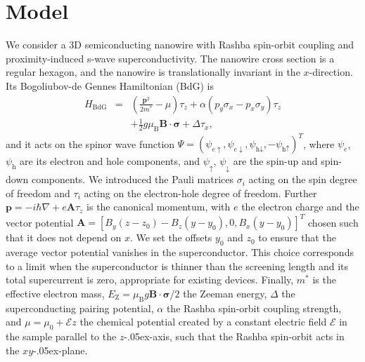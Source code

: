 \section{Model}


We consider a 3D semiconducting nanowire with Rashba spin-orbit coupling and proximity-induced s-wave superconductivity.
The nanowire cross section is a regular hexagon, and the nanowire is translationally invariant in the $x$-direction.
Its Bogoliubov-de Gennes Hamiltonian (BdG) is
\begin{eqnarray}
H_\textrm{BdG} & = & \left(\frac{\mathbf{p}^{2}}{2m^*}-\mu\right)\tau_z+\alpha\left(p_{y}\sigma_x -p_{x}\sigma_y \right)\tau_z\nonumber \\
 &  & +\frac{1}{2}g\mu_\textrm{B}\mathbf{B}\cdot\boldsymbol{\sigma}+\Delta\tau_x,\label{eq:H_BdG}
\end{eqnarray}
and it acts on the spinor wave function $\Psi={\left(\psi_{e\uparrow},\psi_{e\downarrow},\psi_{\textrm{h}\downarrow},-\psi_{\textrm{h}\uparrow}\right)}^{T}$, where $\psi_e$, $\psi_\textrm{h}$ are its electron and hole components, and $\psi_\uparrow$, $\psi_\downarrow$ are the spin-up and spin-down components.
We introduced the Pauli matrices $\sigma_{i}$ acting on the spin degree of freedom and $\tau_{i}$ acting on the electron-hole degree of freedom.
Further $\mathbf{p}=-i\hbar\nabla+e\mathbf{A}\tau_z$ is the canonical momentum, with $e$ the electron charge and the vector potential $\mathbf{A}={\left[ B_y (z - z_0) - B_z (y - y_0), 0, B_x (y - y_0)\right]}^{T}$ chosen such that it does not depend on $x$.
We set the offsets $y_0$ and $z_0$ to ensure that the average vector potential vanishes in the superconductor.
This choice corresponds to a limit when the superconductor is thinner than the screening length and its total supercurrent is zero, appropriate for existing devices.
Finally, $m^*$ is the effective electron mass, $E_\textrm{Z}=\mu_\textrm{B}g\mathbf{B}\cdot\boldsymbol{\sigma}/2$ the Zeeman energy,  $\Delta$ the superconducting pairing potential, $\alpha$ the Rashba spin-orbit coupling strength, and $\mu=\mu_0+\mathcal{E} z$ the chemical potential created by a constant electric field $\mathcal{E}$ in the sample parallel to the $z$\kern-.05ex-axis, such that the Rashba spin-orbit acts in the $xy$\kern-.05ex-plane.


